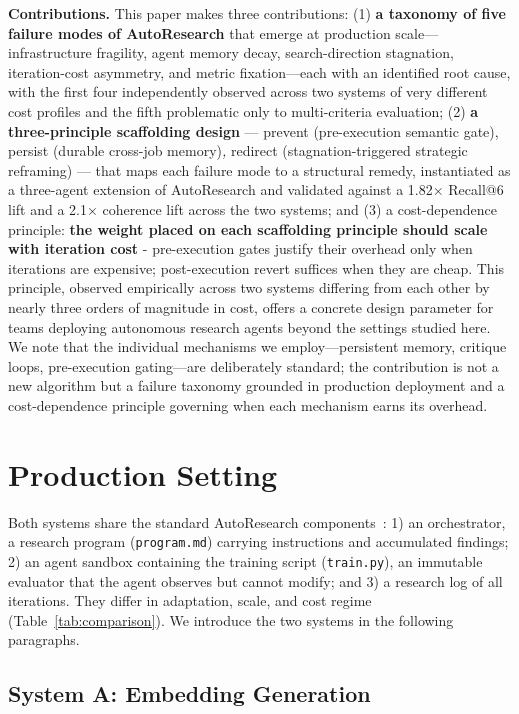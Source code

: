 \documentclass[conference]{IEEEtran}
\begin{document}
\textbf{Contributions.} This paper makes three contributions: (1) \textbf{a taxonomy of five failure modes of AutoResearch} that emerge at production scale---infrastructure fragility, agent memory decay, search-direction stagnation, iteration-cost asymmetry, and metric fixation---each with an identified root cause, with the first four independently observed across two systems of very different cost profiles and the fifth problematic only to multi-criteria evaluation; (2) \textbf{a three-principle scaffolding design} --- prevent\textit{ }(pre-execution semantic gate),\textit{ }persist\textit{ }(durable cross-job memory)\textit{, }redirect (stagnation-triggered strategic reframing) --- that maps each failure mode to a structural remedy, instantiated as a three-agent extension of AutoResearch and validated against a 1.82× Recall@6 lift and a 2.1× coherence lift across the two systems; and (3) a cost-dependence principle: \textbf{the weight placed on each scaffolding principle should scale with iteration cost} - pre-execution gates justify their overhead only when iterations are expensive; post-execution revert suffices when they are cheap. This principle, observed empirically across two systems differing from each other by nearly three orders of magnitude in cost, offers a concrete design parameter for teams deploying autonomous research agents beyond the settings studied here. We note that the individual mechanisms we employ---persistent memory, critique loops, pre-execution gating---are deliberately standard; the contribution is not a new algorithm but a failure taxonomy grounded in production deployment and a cost-dependence principle governing when each mechanism earns its overhead.

\section{Production Setting}

Both systems share the standard AutoResearch components~\cite{karpathy2026autoresearch}: 1) an orchestrator, a research program (\texttt{program.md}) carrying instructions and accumulated findings; 2) an agent sandbox containing the training script (\texttt{train.py}), an immutable evaluator that the agent observes but cannot modify; and 3) a research log of all iterations. They differ in adaptation, scale, and cost regime (Table~\ref{tab:comparison}). We introduce the two systems in the following paragraphs.

\subsection{System A: Embedding Generation}
\end{document}
